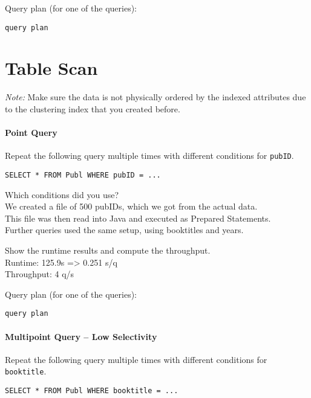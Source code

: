 \documentclass[11pt]{scrartcl}
\begin{document}
\smallskip\noindent
Query plan (for one of the queries):
{\small
\begin{verbatim}
query plan
\end{verbatim}
}


\section{Table Scan}

\noindent \emph{Note:} Make sure the data is not physically ordered by
the indexed attributes due to the clustering index that you created
before.

\paragraph{Point Query}

Repeat the following query multiple times with different conditions for {\tt pubID}.

{\small
\begin{verbatim}
SELECT * FROM Publ WHERE pubID = ...
\end{verbatim}
}

\noindent
Which conditions did you use?\\
We created a file of 500 pubIDs, which we got from the actual data.\\
This file was then read into Java and executed as Prepared Statements.\\
Further queries used the same setup, using booktitles and years.

\smallskip\noindent
Show the runtime results and compute the throughput.\\
Runtime: 125.9s => 0.251 s/q\\
Throughput: 4 q/s

\smallskip\noindent
Query plan (for one of the queries):
{\small
\begin{verbatim}
query plan
\end{verbatim}
}


\paragraph{Multipoint Query -- Low Selectivity}

Repeat the following query multiple times with different conditions for {\tt booktitle}.

{\small
\begin{verbatim}
SELECT * FROM Publ WHERE booktitle = ...
\end{verbatim}
}
\end{document}
